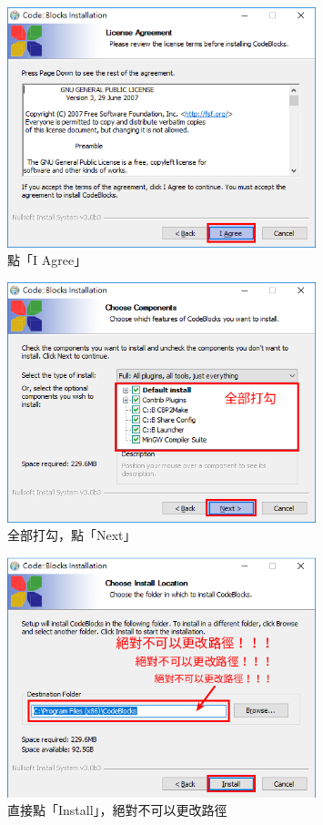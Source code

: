 		\begin{figure}[H]
			\centering
			\includegraphics[width=0.8\textwidth]{fig/install_and_setting/install_005_setup02}
			\caption{點「I Agree」}
		\end{figure}
			
		\begin{figure}[H]
			\centering
			\includegraphics[width=0.8\textwidth]{fig/install_and_setting/install_006_setup03}
			\caption{全部打勾，點「Next」}
		\end{figure}
	
		\begin{figure}[H]
			\centering
			\includegraphics[width=0.8\textwidth]{fig/install_and_setting/install_007_setup04}
			\caption{直接點「Install」，絕對不可以更改路徑}
		\end{figure}

